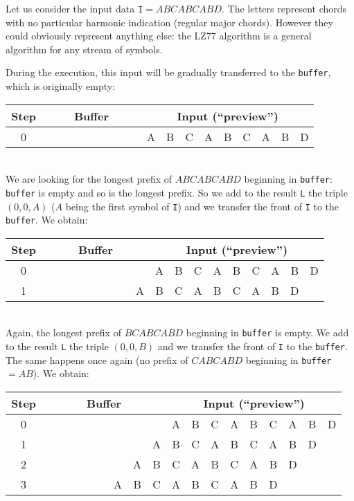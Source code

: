 \documentclass[a4paper,10pt]{article}
\newcommand{\guill}[1]{``#1''}
\begin{document}
Let us consider the input data $\texttt{I}=ABCABCABD$. The letters represent chords with no particular harmonic indication (regular major chords). However they could obviously represent anything else: the LZ77 algorithm is a general algorithm for any stream of symbols.

During the execution, this input will be gradually transferred to the \texttt{buffer}, which is originally empty: \\

\begin{tabular}{|c|c|c|c|c|c|c|c|c|c|c|c|c|c|c|c|c|c|c|}
\hline
\textbf{Step}&\multicolumn{9}{|c|}{\textbf{Buffer}} & \multicolumn{9}{|c|}{\textbf{Input} (\guill{preview})} \\
\hline
0&&&&&&&&&&A&B&C&A&B&C&A&B&D\\
\hline
\end{tabular} \\

We are looking for the longest prefix of $ABCABCABD$ beginning in \texttt{buffer}: \texttt{buffer} is empty and so is the longest prefix. So we add to the result \texttt{L} the triple $(0,0,A)$ ($A$ being the first symbol of \texttt{I}) and we transfer the front of \texttt{I} to the \texttt{buffer}. We obtain: \\

\begin{tabular}{|c|c|c|c|c|c|c|c|c|c|c|c|c|c|c|c|c|c|c|}
\hline
\textbf{Step}&\multicolumn{9}{|c|}{\textbf{Buffer}} & \multicolumn{9}{|c|}{\textbf{Input} (\guill{preview})} \\
\hline
0&&&&&&&&&&A&B&C&A&B&C&A&B&D\\
\hline
1&&&&&&&&&A&B&C&A&B&C&A&B&D&\\
\hline
\end{tabular} \\

Again, the longest prefix of $BCABCABD$ beginning in \texttt{buffer} is empty. We add to the result \texttt{L} the triple $(0,0,B)$ and we transfer the front of \texttt{I} to the \texttt{buffer}. The same happens once again (no prefix of $CABCABD$ beginning in \texttt{buffer}$=AB$). We obtain: \\

\begin{tabular}{|c|c|c|c|c|c|c|c|c|c|c|c|c|c|c|c|c|c|c|}
\hline
\textbf{Step}&\multicolumn{9}{|c|}{\textbf{Buffer}} & \multicolumn{9}{|c|}{\textbf{Input} (\guill{preview})} \\
\hline
0&&&&&&&&&&A&B&C&A&B&C&A&B&D\\
\hline
1&&&&&&&&&A&B&C&A&B&C&A&B&D&\\
\hline
2&&&&&&&&A&B&C&A&B&C&A&B&D&&\\
\hline
3&&&&&&&A&B&C&A&B&C&A&B&D&&&\\
\hline
\end{tabular} \\
\end{document}
